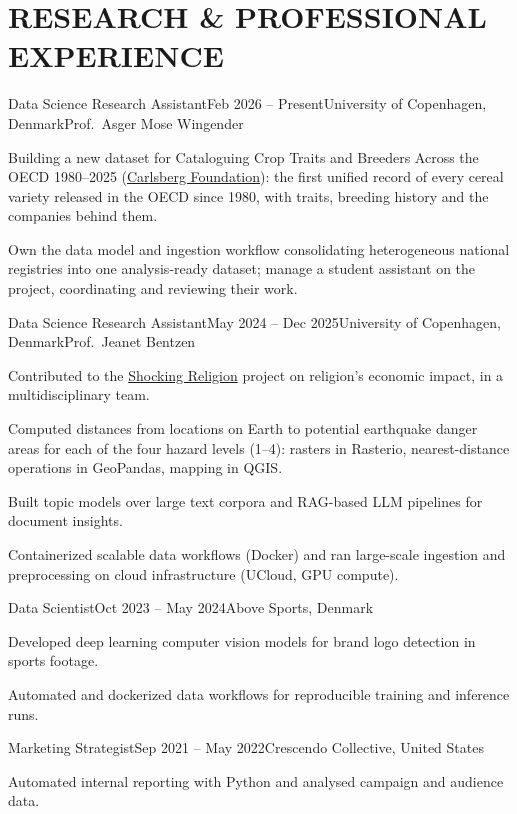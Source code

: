 \documentclass{resume}
\begin{document}
\section{RESEARCH \& PROFESSIONAL EXPERIENCE}
\begin{content}

    \begin{position}{Data Science Research Assistant}{Feb 2026 -- Present}{University of Copenhagen, Denmark}{Prof.~Asger Mose Wingender}{}
        \item Building a new dataset for Cataloguing Crop Traits and Breeders Across the OECD 1980--2025 (\href{https://www.carlsbergfondet.dk/en/}{Carlsberg Foundation}): the first unified record of every cereal variety released in the OECD since 1980, with traits, breeding history and the companies behind them.
        \item Own the data model and ingestion workflow consolidating heterogeneous national registries into one analysis-ready dataset; manage a student assistant on the project, coordinating and reviewing their work.
    \end{position}

    \begin{position}{Data Science Research Assistant}{May 2024 -- Dec 2025}{University of Copenhagen, Denmark}{Prof.~Jeanet Bentzen}{}
        \item Contributed to the {\href{https://www.economics.ku.dk/research/externally-funded-research_new/shocking-religion/}{Shocking Religion}} project on religion's economic impact, in a multidisciplinary team.
        \item Computed distances from locations on Earth to potential earthquake danger areas for each of the four hazard levels (1--4): rasters in Rasterio, nearest-distance operations in GeoPandas, mapping in QGIS.
        \item Built topic models over large text corpora and RAG-based LLM pipelines for document insights.
        \item Containerized scalable data workflows (Docker) and ran large-scale ingestion and preprocessing on cloud infrastructure (UCloud, GPU compute).
    \end{position}

    \begin{position}{Data Scientist}{Oct 2023 -- May 2024}{Above Sports, Denmark}{}{}
        \item Developed deep learning computer vision models for brand logo detection in sports footage.
        \item Automated and dockerized data workflows for reproducible training and inference runs.
    \end{position}

    \begin{position}{Marketing Strategist}{Sep 2021 -- May 2022}{Crescendo Collective, United States}{}{}
        \item Automated internal reporting with Python and analysed campaign and audience data.
    \end{position}

\end{content}
\end{document}
